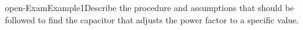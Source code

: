 \begin{question}{open-ExamExample1}Describe the procedure and assumptions that should be followed to find the capacitor that adjusts the power factor to a specific value. 
  
~ 
\end{question}